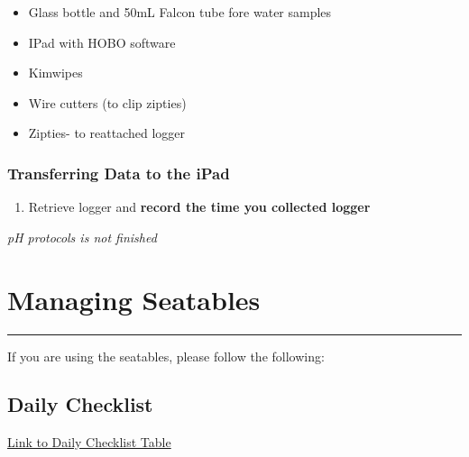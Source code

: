 \documentclass[
  letterpaper,
  DIV=11,
  numbers=noendperiod]{scrreprt}
\providecommand{\tightlist}{%
  \setlength{\itemsep}{0pt}\setlength{\parskip}{0pt}}\usepackage{longtable,booktabs,array}
\begin{document}
\begin{itemize}
\item
  Glass bottle and 50mL Falcon tube fore water samples
\item
  IPad with HOBO software
\item
  Kimwipes
\item
  Wire cutters (to clip zipties)
\item
  Zipties- to reattached logger
\end{itemize}

\hypertarget{transferring-data-to-the-ipad}{%
\subsection*{\texorpdfstring{\textbf{Transferring Data to the
iPad}}{Transferring Data to the iPad}}\label{transferring-data-to-the-ipad}}

\begin{enumerate}
\def\labelenumi{\arabic{enumi}.}
\tightlist
\item
  Retrieve logger and \textbf{record the time you collected logger}
\end{enumerate}

\emph{pH protocols is not finished}

\hypertarget{managing-seatables}{%
\chapter{Managing Seatables}\label{managing-seatables}}

\begin{center}\rule{0.5\linewidth}{0.5pt}\end{center}

If you are using the seatables, please follow the following:

\hypertarget{daily-checklist}{%
\section*{\texorpdfstring{\textbf{Daily
Checklist}}{Daily Checklist}}\label{daily-checklist}}


\href{https://docs.google.com/spreadsheets/d/1oQnhrPk-GJYOvP48skjc4ehimgx4G3M1Ne0vrJx371c/edit\#gid=0}{Link
to Daily Checklist Table}
\end{document}
